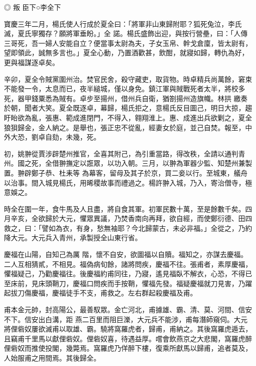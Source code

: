 
\begin{pinyinscope}

 ◎
 叛
 臣下○李全下



 寶慶三年二月，楊氏使人行成於夏全曰：「將軍非山東歸附耶？狐死兔泣，李氏滅，夏氏寧獨存？願將軍垂盼。」全
 諾。楊氏盛飾出迎，與按行營壘，曰：「人傳三哥死，吾一婦人安能自立？便當事太尉為夫，子女玉帛、幹戈倉廩，皆太尉有，望即領此，誠無多言也。」夏全心動，乃置酒歡甚，飲酣，就寢如歸，轉仇為好，更與福謀逐卓矣。



 辛卯，夏全令賊黨圍州治。焚官民舍，殺守藏吏，取貨物。時卓精兵尚萬餘，窘束不能發一令，太息而已，夜半縋城，僅以身免。鎮江軍與賊戰死者太半，將校多死，器甲錢粟悉為賊有。卓步至揚州，借州兵自衛，猶劄揚州造旗幟。林拱
 繳奏於朝，聞者大笑。夏全既逐卓，幕歸，楊氏拒之，意楊氏反目圖己，明日大掠，趨盱眙欲為亂，張惠、範成進閉門，不得入，翱翔淮上。惠、成進出兵欲剿之，夏全狼狽歸金，金人納之。是舉也，張正忠不從亂，經妻女於庭，並己自焚。報至，中外大恐，劉卓自劾，未幾，死。



 初，姚翀從賈涉辟楚州推官，全喜其附己，為引重當路，得改秩，全請以通判青州。國之死，全借翀撫定以誑眾，以功入朝。三月，以翀為軍器少監、知楚州兼製置。翀辟鄭子恭、杜耒等
 為幕客，留母及其子於京，買二妾以行。至城東，艤舟以治事。間入城見楊氏，用晞稷故事而禮過之。楊許翀入城，乃入，寄治僧寺，極意娛之。



 時全在圍一年，食牛馬及人且盡，將自食其軍。初軍民數十萬，至是餘數千矣。四月辛亥，全欲歸於大元，懼眾異議，乃焚香南向再拜，欲自經，而使鄭衍德、田四救之，曰：「譬如為衣，有身，愁無袖耶？今北歸蒙古，未必非福。」全從之，乃約降大元。大元兵入青州，承製授全山東行省。



 慶福在山陽，自知己為厲
 階，懷不自安，欲圖福以自贖。福知之，亦謀去慶福。二人互相猜貳，不相見。福偽病旬餘，諸將問疾，慶福不往。張甫者，素厚慶福，懼福疑己，乃勸慶福往。後慶福約甫同往，乃寢，遙見福臥不解衣，心恐，不得已至床前，見床頭鞘刀，慶福口問疾而手按鞘，懼福先發。福疑慶福就刀見害，乃躍起拔刀傷慶福，慶福徒手不支，甫救之。左右群起殺慶福及甫。



 甫本金元帥，封高陽公，最善馭眾。金亡河北，甫據雄、霸、清、莫、河間、信安不下。信安出白溝，距
 燕二百里而阻巨濼，大元兵不能涉，甫每潛師窺伺。大元將俚砦奴屢欲滅甫以取雄、霸。驍將窩羅虎者，歸甫，甫納之。其後窩羅虎遁去，且竊甫千里馬以獻俚砦奴。俚砦奴喜，待遇益厚。嚐會飲燕京之大悲閣，窩羅虎醉俚砦奴而推使投閣，幾斃焉。窩羅虎乃佯醉下樓，復乘所獻馬以歸甫，追者莫及，人始服甫之用間焉。其後歸全。




\end{pinyinscope}

